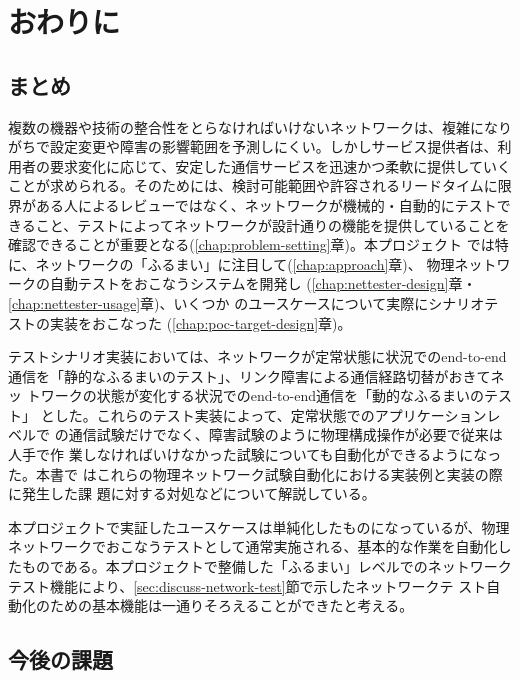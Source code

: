 
\chapter{おわりに}

 \section{まとめ}
 \label{sec:summary}

複数の機器や技術の整合性をとらなければいけないネットワークは、複雑になり
がちで設定変更や障害の影響範囲を予測しにくい。しかしサービス提供者は、利
用者の要求変化に応じて、安定した通信サービスを迅速かつ柔軟に提供していく
ことが求められる。そのためには、検討可能範囲や許容されるリードタイムに限
界がある人によるレビューではなく、ネットワークが機械的・自動的にテストで
きること、テストによってネットワークが設計通りの機能を提供していることを
確認できることが重要となる(\ref{chap:problem-setting}章)。本プロジェクト
では特に、ネットワークの「ふるまい」に注目して(\ref{chap:approach}章)、
物理ネットワークの自動テストをおこなうシステムを開発し
(\ref{chap:nettester-design}章・\ref{chap:nettester-usage}章)、いくつか
のユースケースについて実際にシナリオテストの実装をおこなった
(\ref{chap:poc-target-design}章)。

テストシナリオ実装においては、ネットワークが定常状態に状況でのend-to-end
通信を「静的なふるまいのテスト」、リンク障害による通信経路切替がおきてネッ
トワークの状態が変化する状況でのend-to-end通信を「動的なふるまいのテスト」
とした。これらのテスト実装によって、定常状態でのアプリケーションレベルで
の通信試験だけでなく、障害試験のように物理構成操作が必要で従来は人手で作
業しなければいけなかった試験についても自動化ができるようになった。本書で
はこれらの物理ネットワーク試験自動化における実装例と実装の際に発生した課
題に対する対処などについて解説している。

本プロジェクトで実証したユースケースは単純化したものになっているが、物理
ネットワークでおこなうテストとして通常実施される、基本的な作業を自動化し
たものである。本プロジェクトで整備した「ふるまい」レベルでのネットワーク
テスト機能により、\ref{sec:discuss-network-test}節で示したネットワークテ
スト自動化のための基本機能は一通りそろえることができたと考える。

 \section{今後の課題}
 \label{sec:future-work}

